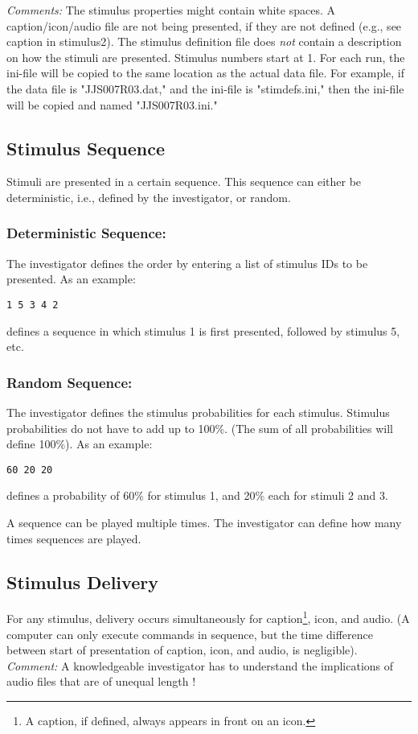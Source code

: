 \documentclass[letterpaper,oneside,12pt]{article}
\begin{document}
\emph{Comments:} The stimulus properties might contain white spaces. A 
caption/icon/audio file are not being presented, if they are not defined (e.g., 
see caption in stimulus2). The stimulus definition file does \emph{not} contain 
a description on how the stimuli are presented. Stimulus numbers start at 1. For 
each run, the ini-file will be copied to the same location as the actual data 
file. For example, if the data file is "JJS007R03.dat," and the ini-file is 
"stimdefs.ini," then the ini-file will be copied and named "JJS007R03.ini."

\subsection{Stimulus Sequence}

Stimuli are presented in a certain sequence. This sequence can either be 
deterministic, i.e., defined by the investigator, or random. 

\subsubsection{Deterministic Sequence:}The investigator defines the order by 
entering a list of stimulus IDs to be presented. As an example: 
\begin{verbatim} 
1 5 3 4 2 
\end{verbatim} 
defines a sequence in which stimulus 1 is first presented, followed by 
stimulus 5, etc.

\subsubsection{Random Sequence:}The investigator defines the stimulus 
probabilities for each stimulus. Stimulus probabilities do not have to
add up to 100\%. (The sum of all probabilities will define 100\%).
As an example: 
\begin{verbatim} 
60 20 20
\end{verbatim} 
defines a probability of 60\% for stimulus 1, and 20\% each for stimuli 2 and 3.

A sequence can be played multiple times. The investigator can define how many 
times sequences are played.

\subsection{Stimulus Delivery}

For any stimulus, delivery occurs simultaneously for caption\footnote{A caption, 
if defined, always appears in front on an icon.}, icon, and audio. (A computer 
can only execute commands in sequence, but the time difference between start of 
presentation of caption, icon, and audio, is negligible). \emph{Comment:} A 
knowledgeable investigator has to understand the implications of audio files 
that are of unequal length !
\end{document}
